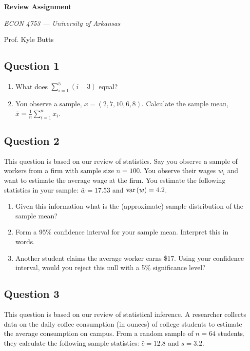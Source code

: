 \documentclass[12pt]{article}
\begin{document}
\begin{center}
  {\Huge\bf Review Assignment}
  
  \smallskip
  {\large\it ECON 4753 — University of Arkansas}

  \medskip
  {\large Prof. Kyle Butts}
\end{center}

\subsection*{Question 1}

\begin{enumerate}[label=(\alph*)]
  \item What does $\sum_{i = 1}^5 (i - 3)$ equal?

  \item You observe a sample, $x = (2, 7, 10, 6, 8)$. Calculate the sample mean, $\bar{x} = \frac{1}{n} \sum_{i = 1}^n x_i$.
\end{enumerate}

\subsection*{Question 2}

This question is based on our review of statistics. 
Say you observe a sample of workers from a firm with sample size $n = 100$.
You observe their wages $w_i$ and want to estimate the average wage at the firm.
You estimate the following statistics in your sample: $\bar{w} = 17.53$ and $\var{w} = 4.2$.

\medskip
\begin{enumerate}[label=(\alph*)]
  \item Given this information what is the (approximate) sample distribution of the sample mean?

  \item Form a 95\% confidence interval for your sample mean. Interpret this in words.

  \item Another student claims the average worker earns \$17. 
  Using your confidence interval, would you reject this null with a 5\% significance level?
\end{enumerate}

\subsection*{Question 3}

This question is based on our review of statistical inference.
A researcher collects data on the daily coffee consumption (in ounces) of college students to estimate the average consumption on campus.
From a random sample of $n = 64$ students, they calculate the following sample statistics: $\bar{c} = 12.8$ and $s = 3.2$.
\end{document}
